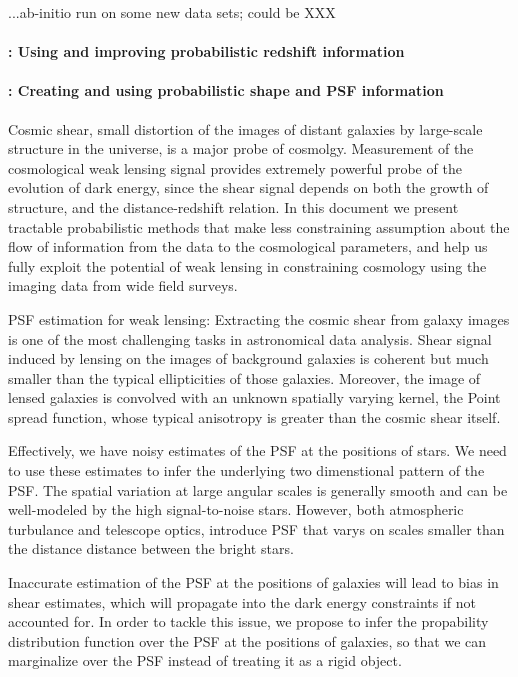 \documentclass[12pt]{article}
\begin{document}
...ab-initio run on some new data sets; could be XXX

\paragraph{: Using and improving probabilistic redshift information}

\paragraph{: Creating and using probabilistic shape and PSF information}

Cosmic shear, small distortion of the images of distant
galaxies by large-scale structure in the universe,
is a major probe of cosmolgy. Measurement of the cosmological
weak lensing signal provides extremely powerful probe of the
evolution of dark energy, since the shear signal depends on
both the growth of structure, and the distance-redshift relation.
In this document we present tractable probabilistic methods that
make less constraining assumption about the flow of information
from the data to the cosmological parameters, and help us fully exploit
the potential of weak lensing in  constraining cosmology using the
imaging data from wide field surveys.

PSF estimation for weak lensing:
Extracting the cosmic shear from galaxy images is one of the most challenging tasks in astronomical
data analysis. Shear signal induced by lensing on the images of background galaxies
is coherent but much smaller than the typical 
ellipticities of those galaxies. Moreover, the image of lensed galaxies is convolved with 
an unknown spatially varying kernel, the Point spread function, whose typical
anisotropy is greater than the cosmic shear itself.
 
Effectively, we have 
noisy estimates of the PSF at the positions of stars. We need to use these estimates to infer the
underlying two dimenstional pattern of the PSF. The spatial variation at large angular scales is 
generally smooth and can be well-modeled by the high signal-to-noise stars. However, both atmospheric
turbulance and telescope optics, introduce PSF that varys on scales smaller than the distance
distance between the bright stars. 

Inaccurate estimation of the PSF at the positions of galaxies will lead to bias in shear estimates,
which will propagate into the dark energy constraints if not accounted for. In order to
tackle this issue, we propose to infer the propability distribution function over the PSF
at the positions of galaxies, so that we can marginalize over the PSF instead of treating it 
as a rigid object.
\end{document}
